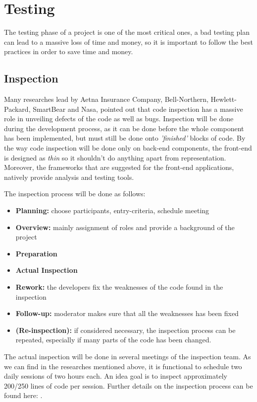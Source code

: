 \section{Testing}
The testing phase of a project is one of the most critical ones, a bad testing
plan can lead to a massive loss of time and money, so it is important to follow
the best practices in order to save time and money.

\subsection{Inspection}
Many researches lead by Aetna Insurance Company, Bell-Northern, Hewlett-Packard,
SmartBear and Nasa, pointed out that code inspection has a massive role in
unveiling defects of the code as well as bugs. Inspection will be done during
the development process, as it can be done before the whole component has been
implemented, but must still be done onto \emph{'finished'} blocks of code. By
the way code inspection will be done only on back-end components, the front-end
is designed as \emph{thin} so it shouldn't do anything apart from
representation. Moreover, the frameworks that are suggested for the front-end
applications, natively provide analysis and testing tools.

The inspection process will be done as follows:
\begin{itemize}
    \item \textbf{Planning:} choose participants, entry-criteria, schedule
        meeting
    \item \textbf{Overview:} mainly assignment of roles and provide a background
        of the project
    \item \textbf{Preparation}
    \item \textbf{Actual Inspection}
    \item \textbf{Rework:} the developers fix the weaknesses of the code found
        in the inspection
    \item \textbf{Follow-up:} moderator makes sure that all the weaknesses has
        been fixed
    \item \textbf{(Re-inspection):} if considered necessary, the inspection
        process can be repeated, especially if many parts of the code has been
        changed.
\end{itemize}

The actual inspection will be done in several meetings of the inspection team.
As we can find in the researches mentioned above, it is functional to schedule
two daily sessions of two hours each. An idea goal is to inspect approximately
200/250 lines of code per session. Further details on the inspection process can
be found here: \cite{smartbear:code-inspection}.

